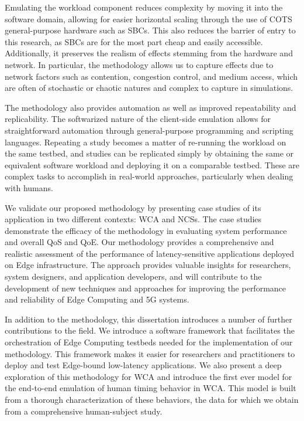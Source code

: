 Emulating the workload component reduces complexity by moving it into the software domain, allowing for easier horizontal scaling through the use of \gls{COTS} general-purpose hardware such as \glspl{SBC}.
This also reduces the barrier of entry to this research, as \glspl{SBC} are for the most part cheap and easily accessible.
Additionally, it preserves the realism of effects stemming from the hardware and network.
In particular, the methodology allows us to capture effects due to network factors such as contention, congestion control, and medium access, which are often of stochastic or chaotic natures and complex to capture in simulations.

The methodology also provides automation as well as improved repeatability and replicability.
The softwarized nature of the client-side emulation allows for straightforward automation through general-purpose programming and scripting languages.
Repeating a study becomes a matter of re-running the workload on the same testbed, and studies can be replicated simply by obtaining the same or equivalent software workload and deploying it on a comparable testbed.
These are complex tasks to accomplish in real-world approaches, particularly when dealing with humans.

We validate our proposed methodology by presenting case studies of its application in two different contexts: \gls{WCA} and \glspl{NCS}.
The case studies demonstrate the efficacy of the methodology in evaluating system performance and overall \gls{QoS} and \gls{QoE}.
Our methodology provides a comprehensive and realistic assessment of the performance of latency-sensitive applications deployed on Edge infrastructure.
The approach provides valuable insights for researchers, system designers, and application developers, and will contribute to the development of new techniques and approaches for improving the performance and reliability of Edge Computing and 5G systems.

In addition to the methodology, this dissertation introduces a number of further contributions to the field. 
We introduce a software framework that facilitates the orchestration of Edge Computing testbeds needed for the implementation of our methodology.
This framework makes it easier for researchers and practitioners to deploy and test Edge-bound low-latency applications.
We also present a deep exploration of this methodology for \gls{WCA} and introduce the first ever model for the end-to-end emulation of human timing behavior in \gls{WCA}.
This model is built from a thorough characterization of these behaviors, the data for which we obtain from a comprehensive human-subject study.

